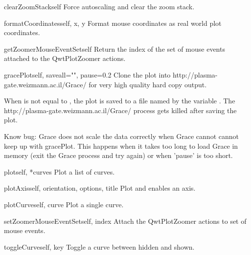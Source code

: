 \documentclass{manual}
\newcommand{\Grace}{\ulink{Grace}
  {http://plasma-gate.weizmann.ac.il/Grace/}}
\begin{document}
\begin{methoddesc}[Plot]{clearZoomStack}{self}
Force autoscaling and clear the zoom stack.
\end{methoddesc}

\begin{methoddesc}[Plot]{formatCoordinates}{self, x, y}
Format mouse coordinates as real world plot coordinates.
\end{methoddesc}

\begin{methoddesc}[Plot]{getZoomerMouseEventSet}{self}
Return the index of the set of mouse events attached to the QwtPlotZoomer
actions.
\end{methoddesc}

\begin{methoddesc}[Plot]{gracePlot}{self, saveall="", pause=0.2}
Clone the plot into \Grace{} for very high quality hard copy output.

When  is not equal to , the plot is saved to a file
named by the variable .
The \Grace{} process gets killed after saving the plot.
 
Know bug: Grace does not scale the data correctly when Grace cannot
cannot keep up with gracePlot.  This happens when it takes too long
to load Grace in memory (exit the Grace process and try again) or
when 'pause' is too short.
\end{methoddesc}

\begin{methoddesc}[Plot]{plot}{self, *curves}
Plot a list of curves.
\end{methoddesc}

\begin{methoddesc}[Plot]{plotAxis}{self, orientation, options, title}
Plot and enables an axis.
\end{methoddesc}

\begin{methoddesc}[Plot]{plotCurve}{self, curve}
Plot a single curve.
\end{methoddesc}

\begin{methoddesc}[Plot]{setZoomerMouseEventSet}{self, index}
Attach the QwtPlotZoomer actions to set of mouse events.
\end{methoddesc}

\begin{methoddesc}[Plot]{toggleCurve}{self, key}
Toggle a curve between hidden and shown.
\end{methoddesc}
\end{document}

